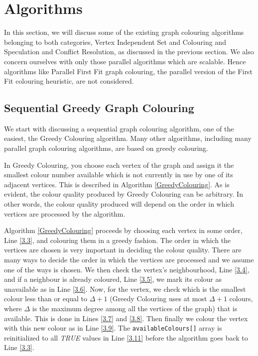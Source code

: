 \documentclass[MTech]{iitmdiss}
\begin{document}
\section{Algorithms}
In this section, we will discuss some of the existing graph colouring algorithms belonging to both categories, Vertex Independent Set and Colouring and Speculation and Conflict Resolution, as discussed in the previous section. We also concern ourselves with only those parallel algorithms which are scalable. Hence algorithms like Parallel First Fit graph colouring, the parallel version of the First Fit colouring heuristic, are not considered. 
\subsection{Sequential Greedy Graph Colouring}
We start with discussing a sequential graph colouring algorithm, one of the easiest, the Greedy Colouring algorithm. Many other algorithms, including many parallel graph colouring algorithms, are based on greedy colouring.

In Greedy Colouring, you choose each vertex of the graph and assign it the smallest colour number available which is not currently in use by one of its adjacent vertices. This is described in Algorithm \ref{GreedyColouring}. As is evident, the colour quality produced by Greedy Colouring can be arbitrary. In other words, the colour quality produced will depend on the order in which vertices are processed by the algorithm.

Algorithm \ref{GreedyColouring} proceeds by choosing each vertex in some order, Line \ref{3.3}, and colouring them in a greedy fashion. The order in which the vertices are chosen is very important in deciding the colour quality. There are many ways to decide the order in which the vertices are processed and we assume one of the ways is chosen. We then check the vertex's neighbourhood, Line \ref{3.4}, and if a neighbour is already coloured, Line \ref{3.5}, we mark its colour as unavailable as in Line \ref{3.6}. Now, for the vertex, we check which is the smallest colour less than or equal to $\Delta+1$ (Greedy Colouring uses at most $\Delta+1$ colours, where $\Delta$ is the maximum degree among all the vertices of the graph) that is available. This is done in Lines \ref{3.7} and \ref{3.8}. Then finally we colour the vertex with this new colour as in Line \ref{3.9}. The \verb+availableColours[]+ array is reinitialized to all \textit{TRUE} values in Line \ref{3.11} before the algorithm goes back to Line \ref{3.3}.  
\end{document}
